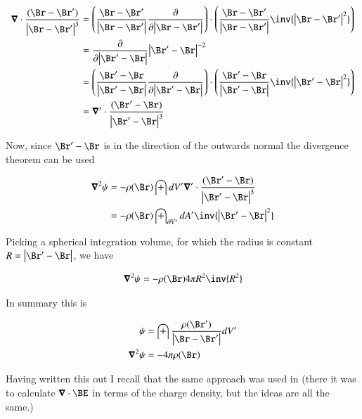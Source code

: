 \begin{align*}
\spacegrad \cdot \frac{(\Br -\Br')}{\Abs{\Br - \Br'}^3}
&= 
\left(\frac{\Br - \Br'}{\Abs{\Br-\Br'}} \PD{\Abs{\Br-\Br'}}{}\right) \cdot
\left(\frac{\Br - \Br'}{\Abs{\Br-\Br'}} \inv{\Abs{\Br-\Br'}^2}\right) \\
&= 
\PD{\Abs{\Br'-\Br}}{} {\Abs{\Br'-\Br}^{-2}} \\
&= 
\left(\frac{\Br' - \Br}{\Abs{\Br'-\Br}} \PD{\Abs{\Br'-\Br}}{}\right) \cdot
\left(\frac{\Br' - \Br}{\Abs{\Br'-\Br}} \inv{\Abs{\Br'-\Br}^2}\right) \\
&= \spacegrad' \cdot \frac{(\Br'-\Br)}{\Abs{\Br' - \Br}^3}
\end{align*}

Now, since $\Br'-\Br$ is in the direction of the outwards normal the divergence theorem can be used

\begin{align*}
\spacegrad^2 \psi 
&= -\rho(\Br) \int dV' \spacegrad' \cdot \frac{(\Br' -\Br)}{\Abs{\Br' - \Br}^3} \\
&= -\rho(\Br) \int_{\partial V'} dA' \inv{\Abs{\Br' - \Br}^2} \\
\end{align*}

Picking a spherical integration volume, for which the radius is constant $R = \Abs{\Br'-\Br}$, we have

\begin{align*}
\spacegrad^2 \psi 
&= -\rho(\Br) 4 \pi R^2 \inv{R^2} \\
\end{align*}

In summary this is

\begin{align}\label{eqn:rayleigh_jeans:laplacianOfPoisson}
\psi &= \int \frac{\rho(\Br')}{\Abs{\Br - \Br'}} dV' \\
\spacegrad^2 \psi &= - 4 \pi \rho(\Br)
\end{align}

Having written this out I recall that the same approach was used in
\cite{schwartz1987pe} (there it was to calculate $\spacegrad \cdot \BE$ in terms of the charge density, but the ideas are all the same.)
